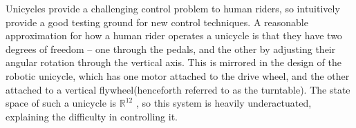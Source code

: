 \documentclass[main.tex]{subfiles}
\begin{document}
	Unicycles provide a challenging control problem to human riders, so intuitively provide a good testing ground for new control techniques.
	A reasonable approximation for how a human rider operates a unicycle is that they have two degrees of freedom -- one through the pedals, and the other by adjusting their angular rotation through the vertical axis.
	This is mirrored in the design of the robotic unicycle, which has one motor attached to the drive wheel, and the other attached to a vertical flywheel\footnotemark (henceforth referred to as the turntable).
	The state space of such a unicycle is $\mathbb{R}^{12}$ \cite{forster}, so this system is heavily underactuated, explaining the difficulty in controlling it.

\end{document}
